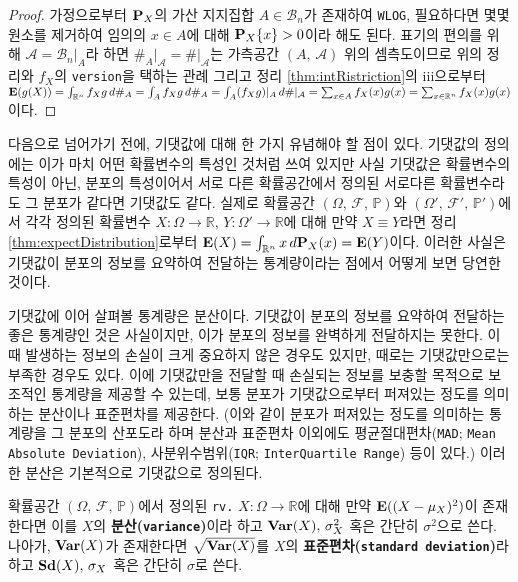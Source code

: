 \begin{proof}
    가정으로부터 $\mathbf{P}_X$의 가산 지지집합 $A\in\mathcal{B}_n$가 존재하여 \texttt{WLOG}, 필요하다면 몇몇 원소를 제거하여 임의의 $x\in A$에 대해 $\mathbf{P}_X\{x\}>0$이라 해도 된다. 표기의 편의를 위해 $\mathcal{A}=\mathcal{B}_n\vert_A$라 하면 $\#_A\vert_\mathcal{A}=\#\vert_\mathcal{A}$는 가측공간 $(A,\,\mathcal{A})$ 위의 셈측도이므로 위의 정리와 $f_X$의 \texttt{version}을 택하는 관례 그리고 정리 \ref{thm:intRistriction}의 iii으로부터 $\mathbf{E}(g(X))=\int_{\mathbb{R}^n}f_Xg\,d\#_A=\int_Af_Xg\,d\#_A=\int_A(f_Xg)\vert_A\,d\#\vert_\mathcal{A}=\sum_{x\in A}f_X(x)g(x)=\sum_{x\in\mathbb{R}^n}f_X(x)g(x)$이다.
\end{proof}

다음으로 넘어가기 전에, 기댓값에 대해 한 가지 유념해야 할 점이 있다. 기댓값의 정의에는 이가 마치 어떤 확률변수의 특성인 것처럼 쓰여 있지만 사실 기댓값은 확률변수의 특성이 아닌, 분포의 특성이어서 서로 다른 확률공간에서 정의된 서로다른 확률변수라도 그 분포가 같다면 기댓값도 같다. 실제로 확률공간 $(\Omega,\,\mathcal{F},\,\mathbb{P})$와 $(\Omega',\,\mathcal{F}',\,\mathbb{P}')$에서 각각 정의된 확률변수 $X:\Omega\to\mathbb{R},\,Y:\Omega'\to\mathbb{R}$에 대해 만약 $X\equiv Y$라면 정리 \ref{thm:expectDistribution}로부터 $\mathbf{E}(X)=\int_{\mathbb{R}^n}x\,d\mathbf{P}_X(x)=\mathbf{E}(Y)$이다. 이러한 사실은 기댓값이 분포의 정보를 요약하여 전달하는 통계량이라는 점에서 어떻게 보면 당연한 것이다.

기댓값에 이어 살펴볼 통계량은 분산이다. 기댓값이 분포의 정보를 요약하여 전달하는 좋은 통계량인 것은 사실이지만, 이가 분포의 정보를 완벽하게 전달하지는 못한다. 이때 발생하는 정보의 손실이 크게 중요하지 않은 경우도 있지만, 때로는 기댓값만으로는 부족한 경우도 있다. 이에 기댓값만을 전달할 때 손실되는 정보를 보충할 목적으로 보조적인 통계량을 제공할 수 있는데, 보통 분포가 기댓값으로부터 퍼져있는 정도를 의미하는 분산이나 표준편차를 제공한다. (이와 같이 분포가 퍼져있는 정도를 의미하는 통계량을 그 분포의 산포도라 하며 분산과 표준편차 이외에도 평균절대편차(\texttt{MAD}; \texttt{Mean Absolute Deviation}), 사분위수범위(\texttt{IQR}; \texttt{InterQuartile Range}) 등이 있다.) 이러한 분산은 기본적으로 기댓값으로 정의된다.

\begin{definition}
    확률공간 $(\Omega,\,\mathcal{F},\,\mathbb{P})$에서 정의된 \texttt{rv.} $X:\Omega\to\mathbb{R}$에 대해 만약 $\mathbf{E}((X-\mu_X)^2)$이 존재한다면 이를 $X$의 \textbf{분산(\texttt{variance})}이라 하고 $\mathbf{Var}(X),\,\sigma_X^2$ 혹은 간단히 $\sigma^2$으로 쓴다. 나아가, $\mathbf{Var}(X)$가 존재한다면 $\sqrt{\mathbf{Var}(X)}$를 $X$의 \textbf{표준편차(\texttt{standard deviation})}라 하고 $\mathbf{Sd}(X),\,\sigma_X$ 혹은 간단히 $\sigma$로 쓴다.
\end{definition}

